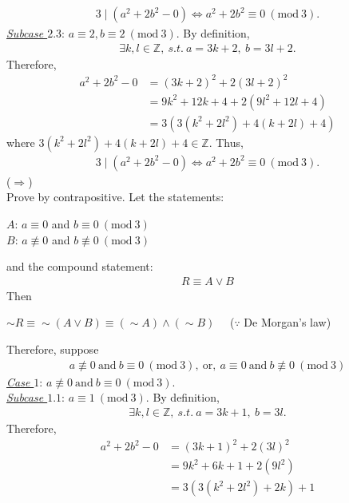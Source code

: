 \documentclass[12pt]{article}
\begin{document}
\begin{gather*}
3 \mid (a^2 + 2 b^2 - 0) \Leftrightarrow a^2 + 2 b^2 \equiv 0~(\mathrm{mod}~3).
\end{gather*}
\underline{\textit{Subcase $2.3$}}: $a \equiv 2, b \equiv 2 ~(\mathrm{mod}~3)$.
By definition,
\begin{gather*}
\exists k, l \in \mathbb{Z},~s.t.~ a = 3k + 2,~b = 3l + 2.
\end{gather*}
Therefore,
\begin{align*}
a^2 + 2 b^2 - 0 &= (3k + 2)^2 + 2 (3l + 2)^2\\[1em]
&= 9k^2 + 12k + 4 + 2(9l^2 + 12l + 4)\\[1em]
&= 3(3(k^2+2l^2) + 4(k+ 2l) + 4)
\end{align*}
where $3(k^2+2l^2) + 4(k+ 2l) + 4 \in \mathbb{Z}$. Thus,
\begin{gather*}
3 \mid (a^2 + 2 b^2 - 0) \Leftrightarrow a^2 + 2 b^2 \equiv 0~(\mathrm{mod}~3).
\end{gather*}
($\Rightarrow$)\\[1em]
Prove by contrapositive. 
Let the statements:
\begin{center}
$A$: $a \equiv 0$ and $b \equiv 0~(\mathrm{mod}~3)$\\[1em]
$B$: $a \not \equiv 0$ and $b \not \equiv 0 ~(\mathrm{mod}~3)$
\end{center}
and the compound statement:
\begin{gather*}
R \equiv A \lor B
\end{gather*}
Then
\begin{center}
$\sim R \equiv \sim(A \lor B) \equiv (\sim A) \land (\sim B)$ ~~($\because$ De Morgan's law) 
\end{center}
Therefore, suppose
\begin{gather*}
a \not \equiv 0~\mathrm{and}~b \equiv 0~(\mathrm{mod}~3),~\mathrm{or}, ~a \equiv 0~\mathrm{and}~b \not \equiv 0~(\mathrm{mod}~3)
\end{gather*}
\underline{\textit{Case $1$}}: $a \not \equiv 0~\mathrm{and}~b \equiv 0~(\mathrm{mod}~3)$.\\[1em]
\underline{\textit{Subcase $1.1$}}: $a \equiv 1~(\mathrm{mod}~3)$.
By definition,
\begin{gather*}
\exists k, l \in \mathbb{Z},~s.t.~ a = 3k + 1,~b = 3l.
\end{gather*}
Therefore,
\begin{align*}
a^2 + 2 b^2 - 0 &= (3k + 1)^2 + 2 (3l)^2\\[1em]
&= 9k^2 + 6k + 1 + 2(9l^2)\\[1em]
&= 3(3(k^2+2l^2) + 2k) + 1
\end{align*}
\end{document}
